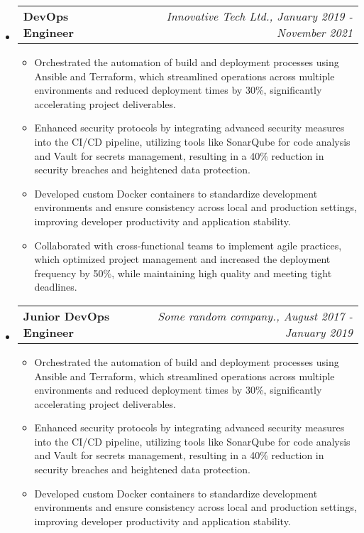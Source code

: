 \documentclass[a4paper,10pt]{article}
\begin{document}
\begin{itemize}[left=0pt]
    \item 
    \begin{tabular}{p{} r}
        \textbf{DevOps Engineer} & \textit{Innovative Tech Ltd., January 2019 - November 2021} \\
    \end{tabular}
    \begin{itemize}[left=0pt]
        \item Orchestrated the automation of build and deployment processes using Ansible and Terraform, which streamlined operations across multiple environments and reduced deployment times by 30\%, significantly accelerating project deliverables.
        \item Enhanced security protocols by integrating advanced security measures into the CI/CD pipeline, utilizing tools like SonarQube for code analysis and Vault for secrets management, resulting in a 40\% reduction in security breaches and heightened data protection.
        \item Developed custom Docker containers to standardize development environments and ensure consistency across local and production settings, improving developer productivity and application stability.
        \item Collaborated with cross-functional teams to implement agile practices, which optimized project management and increased the deployment frequency by 50\%, while maintaining high quality and meeting tight deadlines.
    \end{itemize}

\hfill

    \item 
    \begin{tabular}{p{} r}
        \textbf{Junior DevOps Engineer} & \textit{Some random company., August 2017 - January 2019} \\
    \end{tabular}
    \begin{itemize}[left=0pt]
        \item Orchestrated the automation of build and deployment processes using Ansible and Terraform, which streamlined operations across multiple environments and reduced deployment times by 30\%, significantly accelerating project deliverables.
        \item Enhanced security protocols by integrating advanced security measures into the CI/CD pipeline, utilizing tools like SonarQube for code analysis and Vault for secrets management, resulting in a 40\% reduction in security breaches and heightened data protection.
        \item Developed custom Docker containers to standardize development environments and ensure consistency across local and production settings, improving developer productivity and application stability.
    \end{itemize}
    
\end{itemize}
\end{document}
